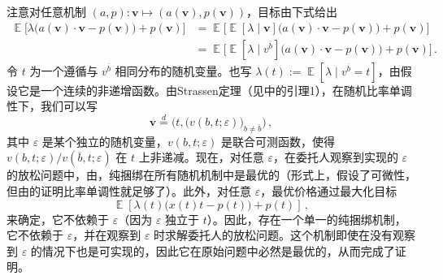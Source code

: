 \documentclass[12pt,letterpaper]{article}
\newenvironment{translation}{\color{blue}\noindent}{}
\theoremstyle{plain}
\theoremstyle{definition}
\theoremstyle{remark}
\DeclareMathOperator{\E}{\mathds{E}}
\renewcommand{\1}{\mathds{1}}
\newcommand\eqid{\stackrel{d}{=}}
\theoremstyle{definition}
\begin{document}
\begin{translation}
注意对任意机制 $(a, p): \mathbf{v} \mapsto (a(\mathbf{v}), p(\mathbf{v}))$，目标由下式给出
\begin{align*}
 \E\Big[\lambda\big(a(\mathbf{v}) \cdot \mathbf{v} - p(\mathbf{v}) \big) + p(\mathbf{v}) \Big] &= \E\Big[\E[\lambda\mid \mathbf{v}]\big(a(\mathbf{v}) \cdot \mathbf{v} - p(\mathbf{v}) \big) + p(\mathbf{v}) \Big]   \\
 & = \E\Big[\E[\lambda \mid v^{\overline{b}}]\big(a(\mathbf{v}) \cdot \mathbf{v} - p(\mathbf{v}) \big) + p(\mathbf{v}) \Big] \,.
\end{align*}
令 $t$ 为一个遵循与 $v^{\overline{b}}$ 相同分布的随机变量。也写 $\lambda(t) := \E[\lambda \mid v^{\overline{b}} = t]$，由假设它是一个连续的非递增函数。由Strassen定理（见\citealt{yang2022costly}中的引理1），在随机比率单调性下，我们可以写
\[\mathbf{v} \eqid \Big(t, \big(v(b, t; \varepsilon)\big)_{b \neq \overline{b}}\Big)\,,\]
其中 $\varepsilon$ 是某个独立的随机变量，$v(b, t; \varepsilon)$ 是联合可测函数，使得 $v(b, t; \varepsilon)/v(\overline{b}, t; \varepsilon)$ 在 $t$ 上非递减。现在，对任意 $\varepsilon$，在委托人观察到实现的 $\varepsilon$ 的放松问题中，由，纯捆绑在所有随机机制中是最优的（形式上，假设了可微性，但由的证明比率单调性就足够了）。此外，对任意 $\varepsilon$，最优价格通过最大化目标
\[\E[\lambda(t) \big(x(t) t - p(t)\big) + p(t)]\,,\]
来确定，它不依赖于 $\varepsilon$（因为 $\varepsilon$ 独立于 $t$）。因此，存在一个单一的纯捆绑机制，它不依赖于 $\varepsilon$，并在观察到 $\varepsilon$ 时求解委托人的放松问题。这个机制即使在没有观察到 $\varepsilon$ 的情况下也是可实现的，因此它在原始问题中必然是最优的，从而完成了证明。
\end{translation}
\end{document}
